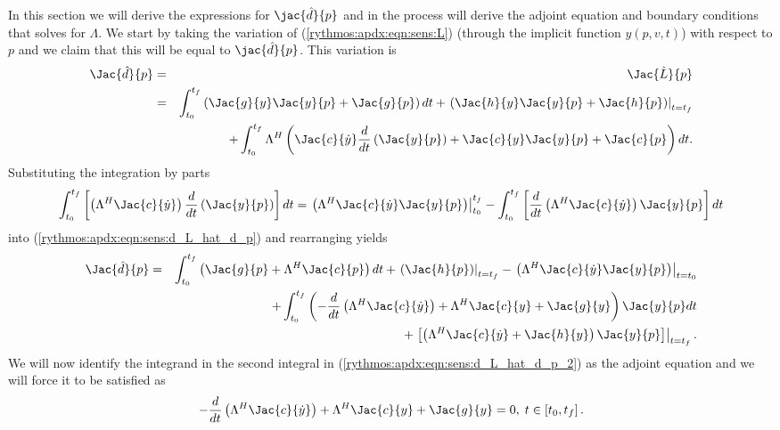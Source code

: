 In this section we will derive the expressions for $\jac{\hat{d}}{p}$ and in
the process will derive the adjoint equation and boundary conditions that
solves for $\Lambda$.  We start by taking the variation of
(\ref{rythmos:apdx:eqn:sens:L}) (through the implicit function $y(p,v,t)$)
with respect to $p$ and we claim that this will be equal to
$\jac{\hat{d}}{p}$.  This variation is
%
\begin{eqnarray}
\Jac{\hat{d}}{p}
& = & \Jac{\hat{L}}{p}
\nonumber \\
& = & \int_{t_0}^{t_f} \left( \Jac{g}{y} \Jac{y}{p} +  \Jac{g}{p} \right) dt
+ \left. \left(  \Jac{h}{y} \Jac{y}{p} + \Jac{h}{p} \right) \right|_{t=t_f}
\nonumber \\
& & + \int_{t_0}^{t_f} \Lambda^H \left( \Jac{c}{\dot{y}} \frac{d}{dt}\left( \Jac{y}{p} \right)
   + \Jac{c}{y} \Jac{y}{p} +  \Jac{c}{p} \right) dt.
\label{rythmos:apdx:eqn:sens:d_L_hat_d_p}
\end{eqnarray}
%
Substituting the integration by parts
%
\begin{equation}
\int_{t_0}^{t_f} \left[ \left( \Lambda^H \Jac{c}{\dot{y}} \right) \frac{d}{dt}\left( \Jac{y}{p} \right) \right] dt
= \left. \left( \Lambda^H \Jac{c}{\dot{y}} \Jac{y}{p} \right) \right|_{t_0}^{t_f}
- \int_{t_0}^{t_f} \left[ \frac{d}{dt}\left( \Lambda^H \Jac{c}{\dot{y}} \right) \Jac{y}{p} \right] dt
\end{equation}
%
into (\ref{rythmos:apdx:eqn:sens:d_L_hat_d_p}) and rearranging yields
%
\begin{eqnarray}
\Jac{\hat{d}}{p}
& = & \int_{t_0}^{t_f} \left(
    \Jac{g}{p}
    + \Lambda^H \Jac{c}{p}
  \right) dt
  + \left. \left( \Jac{h}{p} \right) \right|_{t=t_f}
  - \left. \left( \Lambda^H \Jac{c}{\dot{y}} \Jac{y}{p} \right) \right|_{t=t_0}
\nonumber \\
& & + \int_{t_0}^{t_f} \left(
    - \frac{d}{dt}\left( \Lambda^H \Jac{c}{\dot{y}} \right)
    +  \Lambda^H \Jac{c}{y} +  \Jac{g}{y}
  \right) \Jac{y}{p} dt
\nonumber \\
& & + \left. \left[ \left(
    \Lambda^H \Jac{c}{\dot{y}}
    +  \Jac{h}{y}
  \right)  \Jac{y}{p} \right] \right|_{t=t_f}
\label{rythmos:apdx:eqn:sens:d_L_hat_d_p_2}.
\end{eqnarray}
%
We will now identify the integrand in the second integral in
(\ref{rythmos:apdx:eqn:sens:d_L_hat_d_p_2}) as the adjoint equation and we
will force it to be satisfied as
%
\begin{equation}
- \frac{d}{dt}\left( \Lambda^H \Jac{c}{\dot{y}} \right)
+  \Lambda^H \Jac{c}{y} +  \Jac{g}{y} = 0, \; t \in \left[ t_0, t_f \right].
\label{rythmos:apdx:eqn:sens:adj-trans-2}
\end{equation}
